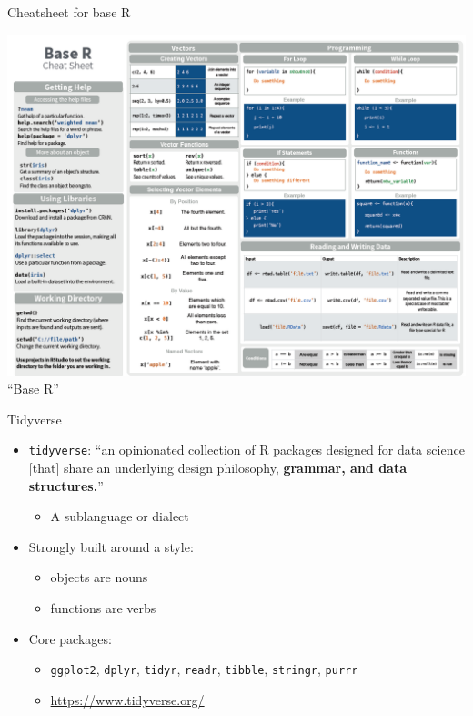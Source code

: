\documentclass[
  ignorenonframetext,
]{beamer}
\providecommand{\tightlist}{%
  \setlength{\itemsep}{0pt}\setlength{\parskip}{0pt}}
\begin{document}
\begin{frame}{Cheatsheet for base R}
\protect\hypertarget{cheatsheet-for-base-r}{}

\includegraphics{../external/images/r_cheatsheet_base.PNG} ``Base R''

\end{frame}

\begin{frame}[fragile]{Tidyverse}
\protect\hypertarget{tidyverse}{}

\begin{itemize}[<+->]
\tightlist
\item
  \texttt{tidyverse}: ``an opinionated collection of R packages designed
  for data science {[}that{]} share an underlying design philosophy,
  \textbf{grammar, and data structures.}''

  \begin{itemize}[<+->]
  \tightlist
  \item
    A sublanguage or dialect
  \end{itemize}
\item
  Strongly built around a style:

  \begin{itemize}[<+->]
  \tightlist
  \item
    objects are nouns
  \item
    functions are verbs
  \end{itemize}
\item
  Core packages:

  \begin{itemize}[<+->]
  \tightlist
  \item
    \texttt{ggplot2}, \texttt{dplyr}, \texttt{tidyr}, \texttt{readr},
    \texttt{tibble}, \texttt{stringr}, \texttt{purrr}
  \item
    \url{https://www.tidyverse.org/}
  \end{itemize}
\end{itemize}

\end{frame}
\end{document}
